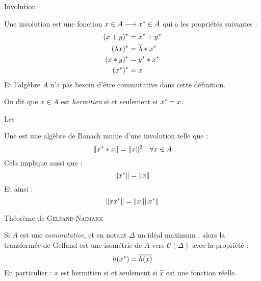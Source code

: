 \documentclass[11pt, draft]{beamer}
\begin{document}
\begin{frame}{Involution}
    \begin{mydef}[Involution]
        Une involution est une fonction $x \in A \longrightarrow x^\ast \in A$ qui a les propriétés suivantes :
        \begin{align*}
            (x + y) ^\ast  &= x^\ast + y^\ast\\
            ( \lambda x) ^\ast &= \overline{\lambda} * x^\ast\\
            ( x * y) ^\ast &= y ^\ast * x^\ast\\
            (x^\ast)^\ast &= x 
        \end{align*}
        Et l'algèbre $A$ n'a pas besoin d'être commutative dans cette définition.

        On dit que $x \in A $ est \emph{hermitien} si et seulement si $x^\ast = x $.
    \end{mydef}
\end{frame}

\begin{frame}{Les \Calgs}
    \begin{mydef}
        Une \Calg est une algèbre de Banach munie d'une involution telle que : 
        \[
            \| x^\ast * x \| = \| x \|^2 \quad \forall x \in A
        \]
        Cela implique aussi que :
        \[
            \| x^\ast \| = \| x \|
        \]
        Et ainsi :
        \[
            \| x x^\ast \| = \| x \| \| x^\ast \|
        \]
    \end{mydef}
\end{frame}

\begin{frame}{Théorème de \textsc{Gelfand}-\textsc{Naimark}}
    \begin{myth}
        Si $A$ est une \Calg \emph{commutative}, et en notant $\Delta$ un idéal maximum , alors la transformée de Gelfand est une isométrie de $A$ vers $\mathcal{C}(\Delta)$
        avec la propriété :
        \[
            h(x^\ast) = \overline{h(x)}
        \]
        En particulier : $x$ est hermitien si et seulement si $\hat{x}$ est une fonction réelle.
    \end{myth}
\end{frame}


\begin{frame}


\end{frame}
\end{document}

